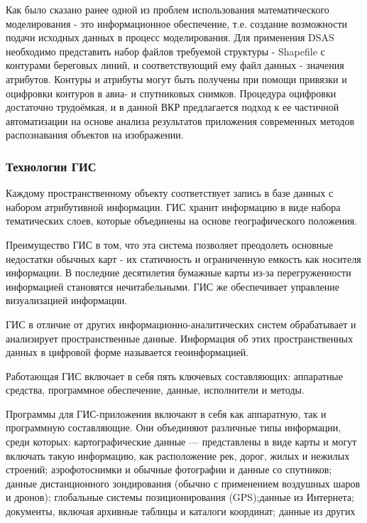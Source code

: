 \documentclass[732,14pt,final]{studrep}
\begin{document}
Как было сказано ранее одной из проблем использования математического моделирования - это информационное обеспечение, т.е. создание возможности подачи исходных данных в процесс моделирования. Для применения DSAS необходимо представить набор файлов требуемой структуры - Shapefile с контурами береговых линий, и соответствующий ему файл данных - значения атрибутов. Контуры и атрибуты могут быть получены при помощи привязки и оцифровки контуров в авиа- и спутниковых снимков. Процедура оцифровки достаточно трудоёмкая, и в данной ВКР предлагается подход к ее частичной автоматизации на основе анализа результатов приложения современных методов распознавания объектов на изображении.

\subsubsection{Технологии ГИС}

Каждому пространственному объекту соответствует запись в базе данных с набором атрибутивной информации. ГИС хранит информацию в виде набора тематических слоев, которые объединены на основе географического положения.

Преимущество ГИС в том, что эта система позволяет преодолеть основные недостатки обычных карт - их статичность и ограниченную емкость как носителя информации. В последние десятилетия бумажные карты из-за перегруженности информацией становятся нечитабельными. ГИС же обеспечивает управление визуализацией информации.

ГИС в отличие от других информационно-аналитических систем обрабатывает и анализирует пространственные данные. Информация об этих пространственных данных в цифровой форме называется геоинформацией.

Работающая ГИС включает в себя пять ключевых составляющих: аппаратные средства, программное обеспечение, данные, исполнители и методы.

Программы для ГИС-приложения включают в себя как аппаратную, так и программную составляющие. Они объединяют различные типы информации, среди которых: картографические данные — представлены в виде карты и могут включать такую информацию, как расположение рек, дорог, жилых и нежилых строений; аэрофотоснимки и обычные фотографии и данные со спутников; данные дистанционного зондирования (обычно с применением воздушных шаров и дронов); глобальные системы позиционирования (GPS);данные из Интернета; документы, включая архивные таблицы и каталоги координат; данные из других
\end{document}
